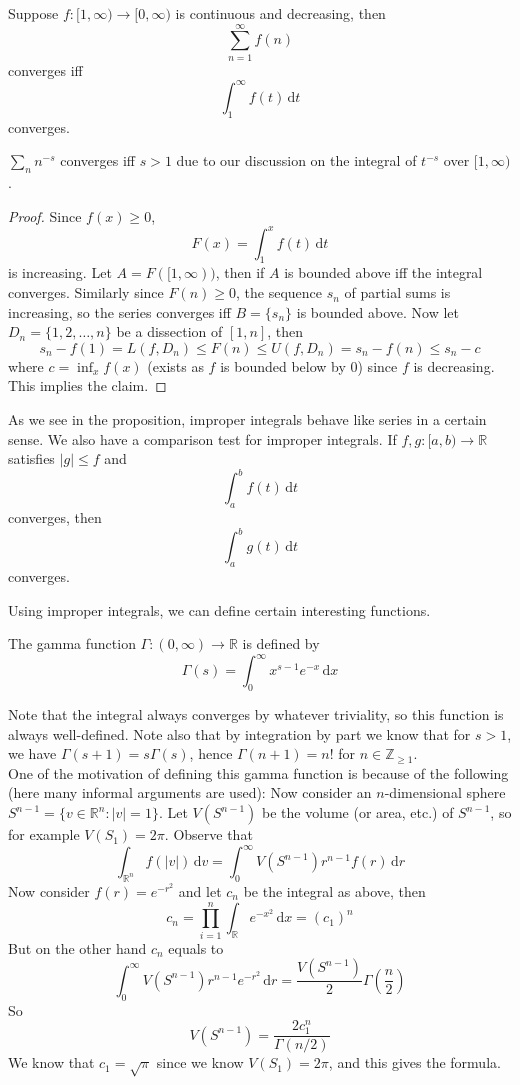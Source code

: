 \begin{proposition}
    Suppose $f:[1,\infty)\to[0,\infty)$ is continuous and decreasing, then
    $$\sum_{n=1}^\infty f(n)$$
    converges iff
    $$\int_1^\infty f(t)\,\mathrm dt$$
    converges.
\end{proposition}
\begin{example}
    $\sum_nn^{-s}$ converges iff $s>1$ due to our discussion on the integral of $t^{-s}$ over $[1,\infty)$.
\end{example}
\begin{proof}
    Since $f(x)\ge 0$,
    $$F(x)=\int_1^x f(t)\,\mathrm dt$$
    is increasing.
    Let $A=F([1,\infty))$, then if $A$ is bounded above iff the integral converges.
    Similarly since $F(n)\ge 0$, the sequence $s_n$ of partial sums is increasing, so the series converges iff $B=\{s_n\}$ is bounded above.
    Now let $D_n=\{1,2,\ldots,n\}$ be a dissection of $[1,n]$, then
    $$s_n-f(1)=L(f,D_n)\le F(n)\le U(f,D_n)=s_n-f(n)\le s_n-c$$
    where $c=\inf_x f(x)$ (exists as $f$ is bounded below by $0$) since $f$ is decreasing.
    This implies the claim.
\end{proof}
\begin{remark}
    As we see in the proposition, improper integrals behave like series in a certain sense.
    We also have a comparison test for improper integrals.
    If $f,g:[a,b)\to\mathbb R$ satisfies $|g|\le f$ and
    $$\int_a^bf(t)\,\mathrm dt$$
    converges, then
    $$\int_a^bg(t)\,\mathrm dt$$
    converges.
\end{remark}
Using improper integrals, we can define certain interesting functions.
\begin{definition}
    The gamma function $\Gamma:(0,\infty)\to\mathbb R$ is defined by
    $$\Gamma(s)=\int_0^\infty x^{s-1}e^{-x}\,\mathrm dx$$
\end{definition}
Note that the integral always converges by whatever triviality, so this function is always well-defined.
Note also that by integration by part we know that for $s>1$, we have $\Gamma(s+1)=s\Gamma(s)$, hence $\Gamma(n+1)=n!$ for $n\in\mathbb Z_{\ge 1}$.\\
One of the motivation of defining this gamma function is because of the following (here many informal arguments are used):
Now consider an $n$-dimensional sphere $S^{n-1}=\{v\in\mathbb R^n:|v|=1\}$.
Let $V(S^{n-1})$ be the volume (or area, etc.) of $S^{n-1}$, so for example $V(S_1)=2\pi$.
Observe that
$$\int_{\mathbb R^n}f(|v|)\,\mathrm dv=\int_0^\infty V(S^{n-1})r^{n-1}f(r)\,\mathrm dr$$
Now consider $f(r)=e^{-r^2}$ and let $c_n$ be the integral as above, then
$$c_n=\prod_{i=1}^n\int_\mathbb Re^{-x^2}\,\mathrm dx=(c_1)^n$$
But on the other hand $c_n$ equals to
$$\int_0^\infty V(S^{n-1})r^{n-1}e^{-r^2}\,\mathrm dr=\frac{V(S^{n-1})}{2}\Gamma\left( \frac{n}{2} \right)$$
So
$$V(S^{n-1})=\frac{2c_1^n}{\Gamma(n/2)}$$
We know that $c_1=\sqrt{\pi}$ since we know $V(S_1)=2\pi$, and this gives the formula.